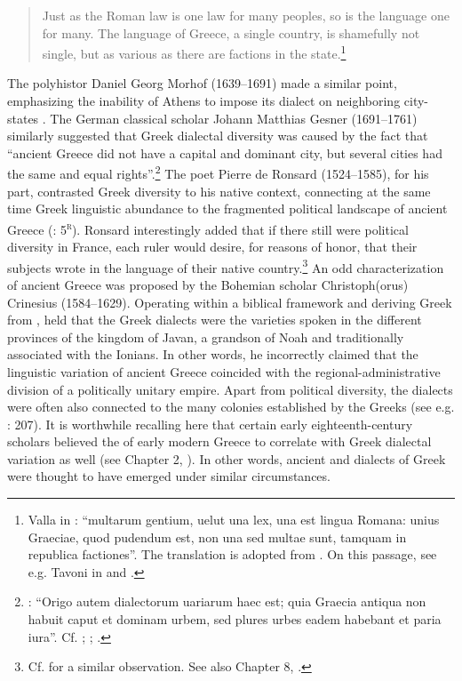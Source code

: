 \begin{quote}
Just as the Roman law is one law for many peoples, so is the  language one for many. The language of Greece, a single country, is shamefully not single, but as various as there are factions in the state.\footnote{Valla in \citet[122]{Regoliosi1993}: “multarum gentium, uelut una lex, una est lingua Romana: unius Graeciae, quod pudendum est, non una sed multae sunt, tamquam in republica factiones”. The translation is adopted from \citet[10]{Trapp1990}. On this passage, see e.g. Tavoni in \citet[90 n.55]{Benvoglienti1975} and \citet[212--213]{Trovato1984}.}
\end{quote}

The polyhistor Daniel Georg Morhof (1639–1691) made a similar point, emphasizing the inability of Athens to impose its dialect on neighboring city-states \citep[146]{Morhof1685}. The German classical scholar Johann Matthias Gesner (1691–1761) similarly suggested that Greek dialectal diversity was caused by the fact that “ancient Greece did not have a capital and dominant city, but several cities had the same and equal rights”.\footnote{\citet[160--161]{Gesner1774}: “Origo autem dialectorum uariarum haec est; quia Graecia antiqua non habuit caput et dominam urbem, sed plures urbes eadem habebant et paria iura”. Cf. \citet[395--396]{Rollin1731}; \citet[136--138]{Priestley1762}; \citet[204]{Ries1786}.} The poet Pierre de Ronsard (1524–1585), for his part, contrasted Greek diversity to his native  context, connecting at the same time Greek linguistic abundance to the fragmented political landscape of ancient Greece (\citeyear{Ronsard1565}: 5\textsc{\textsuperscript{r}}). Ronsard interestingly added that if there still were political diversity in France, each ruler would desire, for reasons of honor, that their subjects wrote in the language of their native country.\footnote{Cf. \citet[lxviii]{Court1778} for a similar observation. See also Chapter 8, .} An odd characterization of ancient Greece was proposed by the Bohemian  scholar Christoph(orus) Crinesius (1584–1629). Operating within a biblical framework and deriving Greek from , \citet[77]{Crinesius1629} held that the Greek dialects were the varieties spoken in the different provinces of the kingdom of Javan, a grandson of Noah and traditionally associated with the Ionians. In other words, he incorrectly claimed that the linguistic variation of ancient Greece coincided with the regional-administrative division of a politically unitary empire. Apart from political diversity, the dialects were often also connected to the many colonies established by the Greeks (see e.g. \citealt{Simonis1752}: 207). It is worthwhile recalling here that certain early eighteenth-century scholars believed the  of early modern Greece to correlate with  Greek dialectal variation as well (see Chapter 2, ). In other words, ancient and  dialects of Greek were thought to have emerged under similar circumstances.

